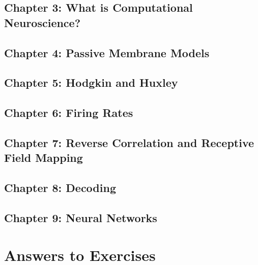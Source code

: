 \documentclass[
]{book}
\begin{document}
\hypertarget{chapter-3-what-is-computational-neuroscience}{%
\section{Chapter 3: What is Computational Neuroscience?}\label{chapter-3-what-is-computational-neuroscience}}

\hypertarget{chapter-4-passive-membrane-models}{%
\section{Chapter 4: Passive Membrane Models}\label{chapter-4-passive-membrane-models}}

\hypertarget{chapter-5-hodgkin-and-huxley}{%
\section{Chapter 5: Hodgkin and Huxley}\label{chapter-5-hodgkin-and-huxley}}

\hypertarget{chapter-6-firing-rates}{%
\section{Chapter 6: Firing Rates}\label{chapter-6-firing-rates}}

\hypertarget{chapter-7-reverse-correlation-and-receptive-field-mapping}{%
\section{Chapter 7: Reverse Correlation and Receptive Field Mapping}\label{chapter-7-reverse-correlation-and-receptive-field-mapping}}

\hypertarget{chapter-8-decoding}{%
\section{Chapter 8: Decoding}\label{chapter-8-decoding}}

\hypertarget{chapter-9-neural-networks}{%
\section{Chapter 9: Neural Networks}\label{chapter-9-neural-networks}}

\hypertarget{Ch11}{%
\chapter{Answers to Exercises}\label{Ch11}}
\end{document}
